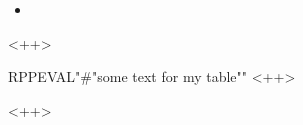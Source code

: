 
\begin{itemize}
	\item 
\end{itemize}<++>
\begin{table}
	\centering
	\begin{tabular}{}
		RPPEVAL{"#{"some text for my table"}"}
		<++>
	\end{tabular}
	\caption{<+Caption text+>}
	\label{tab:<+label+>}
\end{table}<++>

